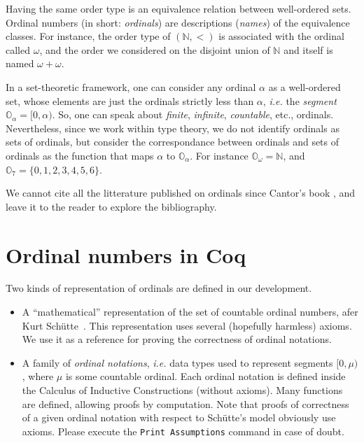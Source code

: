 Having the same order type is an equivalence relation between well-ordered sets. Ordinal numbers (in short: \emph{ordinals})  are descriptions (\emph{names}) of the equivalence classes.
For instance, the order type of $(\mathbb{N},<)$ is associated with the ordinal called  $\omega$, and the order we considered on 
the disjoint union of $\mathbb{N}$ and itself is named $\omega+\omega$.

In a set-theoretic framework, one can consider any ordinal $\alpha$ as a well-ordered set, whose  elements are just the ordinals strictly less than $\alpha$, \emph{i.e.} the \emph{segment} $\mathbb{O}_\alpha=[0, \alpha)$. So, one can speak about \emph{finite}, \emph{infinite}, \emph{countable}, etc., ordinals. Nevertheless, since we work within type theory, 
we do not identify ordinals as sets of ordinals, but consider the correspondance between ordinals and sets of ordinals as the function that maps $\alpha$ to $\mathbb{O}_\alpha$.
For instance $\mathbb{O}_\omega=\mathbb{N}$, and $\mathbb{O}_7=\{0,1,2,3,4,5,6\}$.


We cannot cite all the litterature published on ordinals since Cantor's book 
\cite{cantorbook}, and 
leave it to the reader to explore the bibliography. 


\section{Ordinal numbers in Coq}

Two kinds of representation of ordinals are defined in our development.

\begin{itemize}
\item A ``mathematical'' representation of the set of countable ordinal numbers, afer Kurt Schütte~\cite{schutte}. This representation uses several (hopefully harmless) axioms. We use it as a reference for proving the correctness of ordinal notations.
\item A family of \emph{ordinal notations}, \emph{i.e.} data types used to represent segments $[0,\mu)$, where $\mu$ is some countable ordinal. Each ordinal notation is defined inside the Calculus of Inductive Constructions (without axioms). Many functions are defined, allowing proofs by computation. Note that proofs of 
correctness of a given ordinal notation with respect to Schütte's model obviously use axioms.
Please execute the \texttt{Print Assumptions} command in case of doubt.
\end{itemize}

